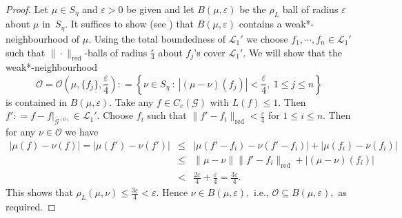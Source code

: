 \documentclass[a4paper,11pt,reqno]{amsart}
\theoremstyle{plain}
\theoremstyle{named}
\numberwithin{equation}{section}
\newcommand{\Bea}{\begin{eqnarray*}}
\newcommand{\Eea}{\end{eqnarray*}}
\begin{document}
			\begin{proof}
				Let $\mu \in S_{\eta}$ and $\varepsilon > 0$ be given and let $B (\mu, \varepsilon)$ be the $\rho_{L}$ ball of radius $\varepsilon$ about $\mu$ in~$S_{\eta}.$ It suffices to show (see \cite[Proposition 1.4 and Theorem 1.8]{Rieffel-1998-Metrics-on-state-from-action-of-cmpt-gp}) that $B(\mu, \varepsilon)$ contains a weak*-neighbourhood of $\mu.$ Using the total boundedness of $\mathcal L_1'$ we choose $f_1, \cdots, f_n \in \mathcal L_1'$ such that $\|\cdot\|_{\mathrm {red}}$-balls of radius $\frac {\varepsilon} {4}$ about $f_j$'s cover $\mathcal L_1'.$ We will show that the weak*-neighbourhood 
				\[
				 \mathcal O  =  \mathcal O \left (\mu, \{f_j\}, \frac {\varepsilon} {4} \right )  : =  \left \{\nu \in S_{\eta}\ :\ \left \lvert (\mu - \nu) (f_j) \right \rvert < \frac {\varepsilon} {4},\ 1 \leq j \leq n \right \}
				\]
			 is contained in $B(\mu, \varepsilon).$ Take any $f \in C_c (\mathcal G)$ with $L (f) \leq 1.$ Then $f' : = f - f \rvert_{\mathcal G^{(0)}} \in \mathcal L_1'.$ Choose \(f_i\) such that $\|f' - f_i\|_{\mathrm {red}} < \frac {\varepsilon} {4}$ for \(1\leq i\leq n\).  Then for any $\nu \in \mathcal O$ we have 
			 \Bea
			 		\left \lvert \mu (f) - \nu (f) \right \rvert = \left \lvert \mu (f') - \nu (f') \right \rvert  & \leq &  \left \lvert \mu (f' - f_i) - \nu (f' - f_i) \right \rvert + \left \lvert \mu (f_i) - \nu (f_i) \right \rvert \\  & \leq &  \|\mu - \nu\| \|f'- f_i \|_{\mathrm {red}} + \left \lvert (\mu - \nu) (f_i) \right \rvert \\ & < &  \frac {2 \varepsilon} {4} + \frac {\varepsilon} {4} =  \frac {3\varepsilon} {4}.   
			 	\Eea
				This shows that $\rho_{L} (\mu, \nu) \leq \frac {3 \varepsilon} {4} < \varepsilon.$ Hence $\nu \in B(\mu, \varepsilon),$ i.e., $\mathcal O \subseteq B(\mu, \varepsilon),$ as required.
			\end{proof}
			
\end{document}
